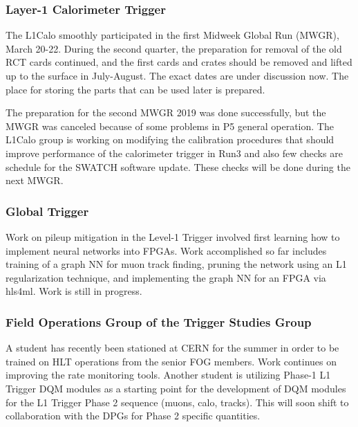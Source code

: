 \documentclass[12pt]{article}
\begin{document}
\subsubsection{Layer-1 Calorimeter Trigger}


The L1Calo smoothly participated in
the first Midweek Global Run (MWGR), March 20-22. 
During the second quarter, the preparation for
removal of the old RCT cards continued, and the first cards and crates should be
removed and lifted up to the surface in July-August. The exact dates are
under discussion now. The place for storing the parts that can be used later is
prepared.  

The preparation for the second MWGR 2019 was done successfully, but the MWGR
was canceled because of some problems in P5 general operation.
The L1Calo group is working on modifying the calibration procedures that should
improve performance of the calorimeter trigger in Run3 and also few checks 
are schedule for the SWATCH software update. These checks will be done 
during the next MWGR.

\subsubsection{Global Trigger}

Work on pileup mitigation in the Level-1 Trigger  involved first learning how to implement neural networks into FPGAs.
Work accomplished so far includes training of a graph NN for muon track finding, pruning the network using an L1 regularization technique, and implementing the graph NN for an FPGA via hls4ml.  Work is still in progress.  

\subsubsection{Field Operations Group of the Trigger Studies Group}

A student has recently been stationed at CERN for the summer in order to be trained on HLT operations from the senior  FOG members. Work continues on improving the rate monitoring tools. Another student is utilizing Phase-1 L1 Trigger DQM modules as a starting point for 
the development of DQM modules for the L1 Trigger Phase 2 sequence
(muons, calo, tracks). This will
soon shift to collaboration with the DPGs for Phase 2 specific
quantities.  
\end{document}

